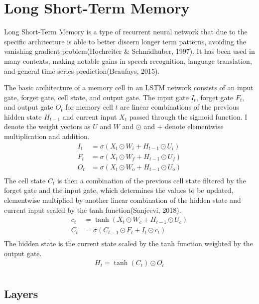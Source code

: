 \documentclass[12pt,twoside]{dukestatscithesis}
\begin{document}
\section{Long Short-Term Memory}\label{long-short-term-memory}

Long Short-Term Memory is a type of recurrent neural network that due to
the specific architecture is able to better discern longer term
patterns, avoiding the vanishing gradient problem(Hochreiter \&
Schmidhuber, 1997). It has been used in many contexts, making notable
gains in speech recognition, language translation, and general time
series prediction(Beaufays, 2015).

The basic architecture of a memory cell in an LSTM network consists of
an input gate, forget gate, cell state, and output gate. The input gate
\(I_t\), forget gate \(F_t\), and output gate \(O_t\) for memory cell
\(t\) are linear combinations of the previous hidden state \(H_{t-1}\)
and current input \(X_t\) passed through the sigmoid function. I denote
the weight vectors as \(U\) and \(W\) and \(\odot\) and \(+\) denote
elementwise multiplication and addition.
\begin{align}
  I_t &= \sigma(X_t\odot W_i + H_{t-1}\odot U_i) \label{eq:6} \\ 
  F_t &= \sigma(X_t\odot W_f + H_{t-1}\odot U_f) \label{eq:7} \\ 
  O_t &= \sigma(X_t\odot W_o + H_{t-1}\odot U_o) \label{eq:8} \\ 
\end{align}
The cell state \(C_t\) is then a combination of the previous cell state
filtered by the forget gate and the input gate, which determines the
values to be updated, elementwise multiplied by another linear
combination of the hidden state and current input scaled by the tanh
function(Sanjeevi, 2018).
\begin{align}
  c_t &= \tanh(X_t\odot W_c + H_{t-1}\odot U_c) \label{eq:9} \\ 
  C_t &= \sigma(C_{t-1}\odot F_t + I_t\odot c_t) \label{eq:10} \\ 
\end{align}
The hidden state is the current state scaled by the tanh function
weighted by the output gate.
\begin{align}
  H_t = \tanh(C_t)\odot O_t \label{eq:11} \\ 
\end{align}
\subsection{Layers}\label{layers}
\end{document}
